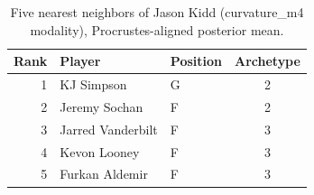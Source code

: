 \begin{table}[htbp]
  \centering\small
  \begin{tabular}{rllc}
    \toprule
    Rank & Player & Position & Archetype \\
    \midrule
    1 & KJ Simpson & G & 2 \\
    2 & Jeremy Sochan & F & 2 \\
    3 & Jarred Vanderbilt & F & 3 \\
    4 & Kevon Looney & F & 3 \\
    5 & Furkan Aldemir & F & 3 \\
    \bottomrule
  \end{tabular}
  \caption{Five nearest neighbors of Jason Kidd (curvature_m4 modality), Procrustes-aligned posterior mean.}
  \label{tab:Jason_Kidd_neighbors_curvature_m4}
\end{table}

